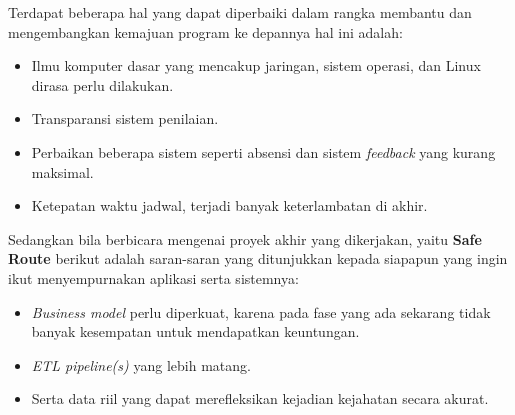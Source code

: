 Terdapat beberapa hal yang dapat diperbaiki dalam rangka membantu dan mengembangkan kemajuan program ke depannya hal ini adalah:
\begin{itemize}
    \item Ilmu komputer dasar yang mencakup jaringan, sistem operasi, dan Linux dirasa perlu dilakukan.
    \item Transparansi sistem penilaian.
    \item Perbaikan beberapa sistem seperti absensi dan sistem \textit{feedback} yang kurang maksimal.
    \item Ketepatan waktu jadwal, terjadi banyak keterlambatan di akhir.
\end{itemize}
Sedangkan bila berbicara mengenai proyek akhir yang dikerjakan, yaitu \textbf{Safe Route} berikut adalah saran-saran yang ditunjukkan kepada siapapun yang ingin ikut menyempurnakan aplikasi serta sistemnya:
\begin{itemize}
    \item \textit{Business model} perlu diperkuat, karena pada fase yang ada sekarang tidak banyak kesempatan untuk mendapatkan keuntungan.
    \item \textit{ETL pipeline(s)} yang lebih matang.
    \item Serta data riil yang dapat merefleksikan kejadian kejahatan secara akurat.
\end{itemize}